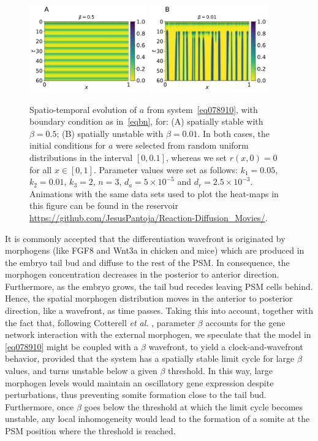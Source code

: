 \documentclass[%
 preprint,
 aip, 
 amsmath,amssymb,
]{revtex4-2}
\begin{document}
	\begin{figure}[t!]
		\centering
		\includegraphics[width=2in]{Fig03a.pdf}
		\includegraphics[width=2in]{Fig03b.pdf}
		\caption{Spatio-temporal evolution of $a$ from system~\eqref{eq078910}, with boundary condition as in~\eqref{eqbn}, for: (A) spatially stable with $\beta=0.5$; (B) spatially unstable with $\beta=0.01$. In both cases, the initial conditions for $a$ were selected from random uniform distributions in the interval $[0, 0.1]$, whereas we set $r(x, 0) = 0$ for all $x\in[0,1]$. Parameter values were set as follows: $k_1=0.05$, $k_2=0.01$, $k_3=2$, $n=3$, $d_a = 5\times10^{-5}$ and $d_r=2.5\times10^{-3}$. Animations with the same data sets used to plot the heat-maps in this figure can be found in the reservoir \url{https://github.com/JesusPantoja/Reaction-Diffusion_Movies/}.}
		\label{Fig03}
	\end{figure}

It is commonly accepted that the differentiation wavefront is originated by morphogens (like FGF8 and Wnt3a in chicken and mice) which are produced in the embryo tail bud and diffuse to the rest of the PSM. In consequence, the morphogen concentration decreases in the posterior to anterior direction. Furthermore, as the embryo grows, the tail bud recedes leaving PSM cells behind. Hence, the spatial morphogen distribution moves in the anterior to posterior direction, like a wavefront, as time passes. Taking this into account, together with the fact that, following Cotterell \emph{et al.} \citep{Cotterell2015}, parameter $\beta$ accounts for the gene network interaction with the external morphogen, we speculate that the model in \eqref{eq078910} might be coupled with a $\beta$ wavefront, to yield a clock-and-wavefront behavior, provided that the system has a spatially stable limit cycle for large $\beta$ values, and turns unstable below a given $\beta$ threshold. In this way, large morphogen levels would maintain an oscillatory gene expression despite perturbations, thus preventing somite formation close to the tail bud. Furthermore, once $\beta$ goes below the threshold at which the limit cycle becomes unstable, any local inhomogeneity would lead to the formation of a somite at the PSM position where the threshold is reached.
\end{document}
